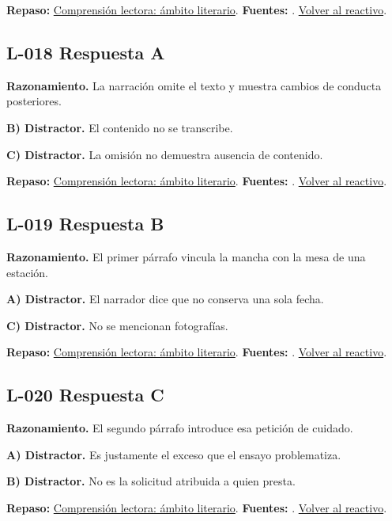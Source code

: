 \textbf{Repaso:} \hyperref[sec:l2]{Comprensión lectora: ámbito literario}. \textbf{Fuentes:} \cite{ceneval,reading}. \hyperref[q:L-017]{Volver al reactivo}.\par\medskip

\subsection*{L-018 \quad Respuesta A}\label{s:L-018}
\textbf{Razonamiento.} La narración omite el texto y muestra cambios de conducta posteriores.

\textbf{B) Distractor. }El contenido no se transcribe.

\textbf{C) Distractor. }La omisión no demuestra ausencia de contenido.

\textbf{Repaso:} \hyperref[sec:l2]{Comprensión lectora: ámbito literario}. \textbf{Fuentes:} \cite{ceneval,reading}. \hyperref[q:L-018]{Volver al reactivo}.\par\medskip

\subsection*{L-019 \quad Respuesta B}\label{s:L-019}
\textbf{Razonamiento.} El primer párrafo vincula la mancha con la mesa de una estación.

\textbf{A) Distractor. }El narrador dice que no conserva una sola fecha.

\textbf{C) Distractor. }No se mencionan fotografías.

\textbf{Repaso:} \hyperref[sec:l2]{Comprensión lectora: ámbito literario}. \textbf{Fuentes:} \cite{ceneval,reading}. \hyperref[q:L-019]{Volver al reactivo}.\par\medskip

\subsection*{L-020 \quad Respuesta C}\label{s:L-020}
\textbf{Razonamiento.} El segundo párrafo introduce esa petición de cuidado.

\textbf{A) Distractor. }Es justamente el exceso que el ensayo problematiza.

\textbf{B) Distractor. }No es la solicitud atribuida a quien presta.

\textbf{Repaso:} \hyperref[sec:l2]{Comprensión lectora: ámbito literario}. \textbf{Fuentes:} \cite{ceneval,reading}. \hyperref[q:L-020]{Volver al reactivo}.\par\medskip

